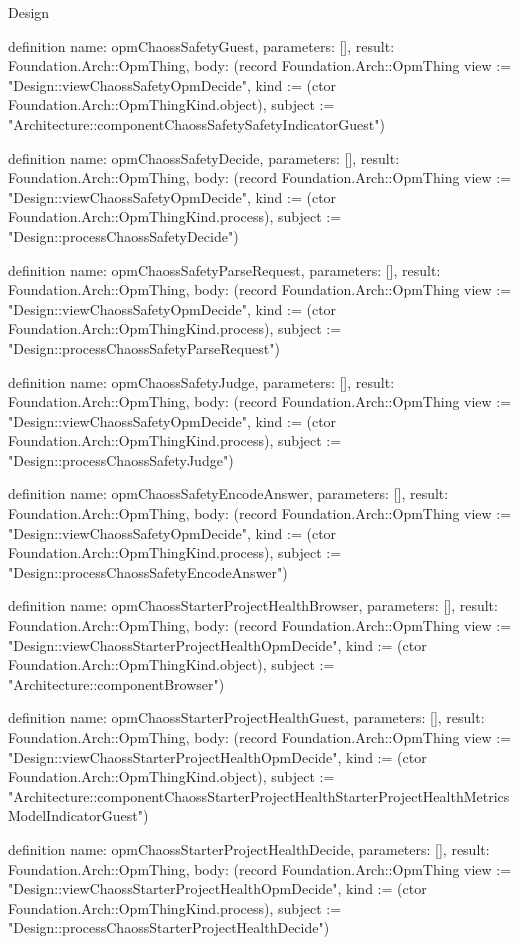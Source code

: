 \begin{lexlean}{Design}
\begin{semanticmodule}
definition{
  name: opmChaossSafetyGuest,
  parameters: [],
  result: Foundation.Arch::OpmThing,
  body: (record Foundation.Arch::OpmThing {view := "Design::viewChaossSafetyOpmDecide", kind := (ctor Foundation.Arch::OpmThingKind.object), subject := "Architecture::componentChaossSafetySafetyIndicatorGuest"})
}

definition{
  name: opmChaossSafetyDecide,
  parameters: [],
  result: Foundation.Arch::OpmThing,
  body: (record Foundation.Arch::OpmThing {view := "Design::viewChaossSafetyOpmDecide", kind := (ctor Foundation.Arch::OpmThingKind.process), subject := "Design::processChaossSafetyDecide"})
}

definition{
  name: opmChaossSafetyParseRequest,
  parameters: [],
  result: Foundation.Arch::OpmThing,
  body: (record Foundation.Arch::OpmThing {view := "Design::viewChaossSafetyOpmDecide", kind := (ctor Foundation.Arch::OpmThingKind.process), subject := "Design::processChaossSafetyParseRequest"})
}

definition{
  name: opmChaossSafetyJudge,
  parameters: [],
  result: Foundation.Arch::OpmThing,
  body: (record Foundation.Arch::OpmThing {view := "Design::viewChaossSafetyOpmDecide", kind := (ctor Foundation.Arch::OpmThingKind.process), subject := "Design::processChaossSafetyJudge"})
}

definition{
  name: opmChaossSafetyEncodeAnswer,
  parameters: [],
  result: Foundation.Arch::OpmThing,
  body: (record Foundation.Arch::OpmThing {view := "Design::viewChaossSafetyOpmDecide", kind := (ctor Foundation.Arch::OpmThingKind.process), subject := "Design::processChaossSafetyEncodeAnswer"})
}

definition{
  name: opmChaossStarterProjectHealthBrowser,
  parameters: [],
  result: Foundation.Arch::OpmThing,
  body: (record Foundation.Arch::OpmThing {view := "Design::viewChaossStarterProjectHealthOpmDecide", kind := (ctor Foundation.Arch::OpmThingKind.object), subject := "Architecture::componentBrowser"})
}

definition{
  name: opmChaossStarterProjectHealthGuest,
  parameters: [],
  result: Foundation.Arch::OpmThing,
  body: (record Foundation.Arch::OpmThing {view := "Design::viewChaossStarterProjectHealthOpmDecide", kind := (ctor Foundation.Arch::OpmThingKind.object), subject := "Architecture::componentChaossStarterProjectHealthStarterProjectHealthMetricsModelIndicatorGuest"})
}

definition{
  name: opmChaossStarterProjectHealthDecide,
  parameters: [],
  result: Foundation.Arch::OpmThing,
  body: (record Foundation.Arch::OpmThing {view := "Design::viewChaossStarterProjectHealthOpmDecide", kind := (ctor Foundation.Arch::OpmThingKind.process), subject := "Design::processChaossStarterProjectHealthDecide"})
}


\end{semanticmodule}
\end{lexlean}
